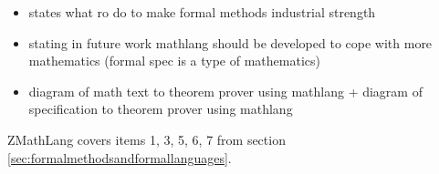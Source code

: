 \begin{itemize}
\item \cite{fmpresetation} states what ro do to make formal methods industrial strength

\item \cite{lamarphd} stating in future work mathlang should be developed to cope with more mathematics (formal spec is a type of mathematics)

\item diagram of math text to theorem prover using mathlang + diagram of specification to theorem prover using mathlang
\end{itemize}

ZMathLang covers items 1, 3, 5, 6, 7 from section \ref{sec:formalmethodsandformallanguages}.